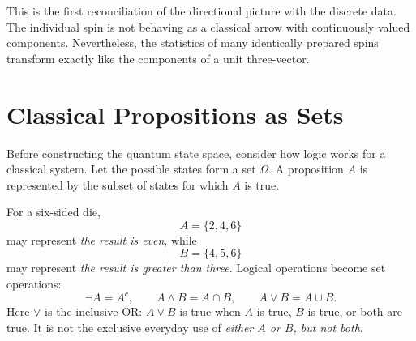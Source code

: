 \begin{classroomqa}
\end{classroomqa}

This is the first reconciliation of the directional picture with the discrete data. The individual spin is not behaving as a classical arrow with continuously valued components. Nevertheless, the statistics of many identically prepared spins transform exactly like the components of a unit three-vector.

\section{Classical Propositions as Sets}

Before constructing the quantum state space, consider how logic works for a classical system. Let the possible states form a set \(\Omega\). A proposition \(A\) is represented by the subset of states for which \(A\) is true.

For a six-sided die,
\[
A=\{2,4,6\}
\]
may represent \emph{the result is even}, while
\[
B=\{4,5,6\}
\]
may represent \emph{the result is greater than three}. Logical operations become set operations:
\begin{equation}
\neg A=A^c,\qquad
A\land B=A\cap B,\qquad
A\lor B=A\cup B.
\label{eq:classical-logic}
\end{equation}
Here \(\lor\) is the inclusive OR: \(A\lor B\) is true when \(A\) is true, \(B\) is true, or both are true. It is not the exclusive everyday use of \emph{either \(A\) or \(B\), but not both}.

\begin{classroomqa}
\end{classroomqa}

